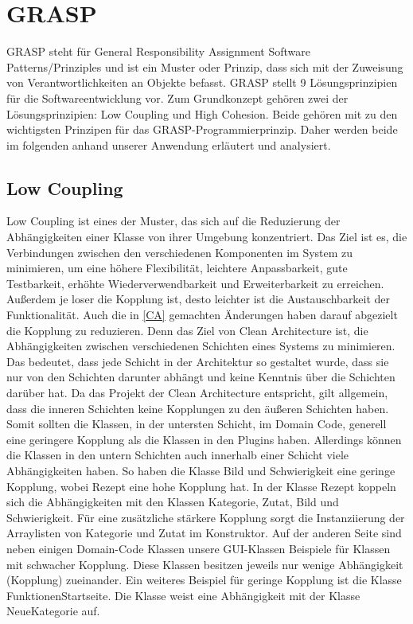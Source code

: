 \section{GRASP}
GRASP steht für General Responsibility Assignment Software Patterns/Prinziples und ist ein Muster oder Prinzip, dass sich mit der Zuweisung von Verantwortlichkeiten an Objekte befasst. GRASP stellt 9 Lösungsprinzipien für die Softwareentwicklung vor. Zum Grundkonzept gehören zwei der Lösungsprinzipien: Low Coupling und High Cohesion. Beide gehören mit zu den wichtigsten Prinzipen für das GRASP-Programmierprinzip. Daher werden beide im folgenden anhand unserer Anwendung erläutert und analysiert.

\subsection{Low Coupling}
Low Coupling ist eines der Muster, das sich auf die Reduzierung der Abhängigkeiten einer Klasse von ihrer Umgebung konzentriert. Das Ziel ist es, die Verbindungen zwischen den verschiedenen Komponenten im System zu minimieren, um eine höhere Flexibilität, leichtere Anpassbarkeit, gute Testbarkeit, erhöhte Wiederverwendbarkeit und Erweiterbarkeit zu erreichen. Außerdem je loser die Kopplung ist, desto leichter ist die Austauschbarkeit der Funktionalität.
Auch die in \autoref{CA} gemachten Änderungen haben darauf abgezielt die Kopplung zu reduzieren. Denn das Ziel von Clean Architecture ist, die Abhängigkeiten zwischen verschiedenen Schichten eines Systems zu minimieren. Das bedeutet, dass jede Schicht in der Architektur so gestaltet wurde, dass sie nur von den Schichten darunter abhängt und keine Kenntnis über die Schichten darüber hat. Da das Projekt der Clean Architecture entspricht, gilt allgemein, dass die inneren Schichten keine Kopplungen zu den äußeren Schichten haben. 
Somit sollten die Klassen, in der untersten Schicht, im Domain Code, generell eine geringere Kopplung als die Klassen in den Plugins haben. Allerdings können die Klassen in den untern Schichten auch innerhalb einer Schicht viele Abhängigkeiten haben. So haben die Klasse Bild und Schwierigkeit eine geringe Kopplung, wobei Rezept eine hohe Kopplung hat.  
In der Klasse Rezept koppeln sich die Abhängigkeiten mit den Klassen Kategorie, Zutat, Bild und Schwierigkeit. Für eine zusätzliche stärkere Kopplung sorgt die Instanziierung der Arraylisten von Kategorie und Zutat im Konstruktor.
Auf der anderen Seite sind neben einigen Domain-Code Klassen unsere GUI-Klassen Beispiele für Klassen mit schwacher Kopplung. Diese Klassen besitzen jeweils nur wenige Abhängigkeit (Kopplung) zueinander. 
Ein weiteres Beispiel für geringe Kopplung ist die Klasse FunktionenStartseite. Die Klasse weist eine Abhängigkeit mit der Klasse NeueKategorie auf.

